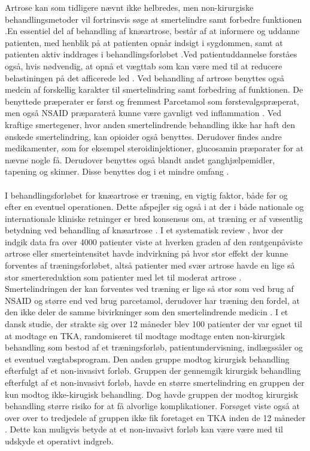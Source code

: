 Artrose kan som tidligere nævnt ikke helbredes, men non-kirurgiske behandlingsmetoder vil fortrinsvis søge at smertelindre samt forbedre funktionen \citep{brostrom2012}.En essentiel del af behandling af knæartrose, består af at informere og uddanne patienten, med henblik på at patienten opnår indsigt i sygdommen, samt at patienten aktiv inddrages i behandlingsforløbet .Ved  patientuddannelse forståes også, hvis nødvendig, at opnå et vægttab som kan være med til at reducere belastiningen på det afficerede led \citep{brostrom2012}.
Ved behandling af artrose benyttes også medcin af forskellig karakter til smertelindring samt forbedring af funktionen. De benyttede præperater er først og fremmest Parcetamol som  førstevalgspræperat, men  også NSAID præparaterå kunne være gavnligt ved inflammation \citep{schroder}. Ved kraftige smertegener, hvor anden smertelindrende behandling ikke har haft den ønskede smertelindring, kan opioider også benyttes. Derudover findes andre medikamenter, som for eksempel steroidinjektioner, glucosamin præparater for at nævne nogle få. Derudover benyttes også blandt andet ganghjælpemidler, tapening og skinner. Disse benyttes dog i et mindre omfang \citep{brostrom2012}.\\\\

I behandlingsforløbet for knæartrose er træning, en vigtig faktor, både før og efter en eventuel operationen. Dette afspejler sig også i at der i både nationale og internationale kliniske retninger er bred konsensus om, at træning er af væsentlig betydning ved behandling af  knæartrose  \citep{brostrom2012}.  I et systematisk review , hvor der indgik data fra over 4000 patienter viste at hverken graden af den røntgenpåviste artrose eller smerteintensitet havde indvirkning på hvor stor effekt der kunne forventes af træningsforløbet, altså patienter med svær artrose havde en lige så stor smertereduktion som patienter med let til moderat artrose \citep{Syssorenskou}. 
Smertelindringen der kan forventes ved træning er lige så stor som ved brug af NSAID og større end  ved brug parcetamol, derudover har træning den fordel, at den ikke deler de samme bivirkninger som den smertelindrende medicin \citep{sorenskou}.
I et dansk studie, der strakte sig over 12 måneder blev 100 patienter  der var egnet til at modtage en TKA, randomiseret til modtage modtage enten non-kirurgisk behandling som bestod af et træningsforløb, patientundervisning, indlægssåler og et eventuel vægtabsprogram. Den anden gruppe modtog kirurgisk behandling efterfulgt af et non-invasivt forløb. Gruppen der gennemgik kirurgisk behandling efterfulgt af  et non-invasivt forløb, havde en større smertelindring en gruppen der kun modtog ikke-kirugisk behandling. Dog havde gruppen der modtog kirurgisk behandling større risiko for at få alvorlige komplikationer. Forsøget viste også at over over to tredjedele af gruppen ikke fik foretaget en TKA inden de 12 måneder \citep{newEngland}. Dette kan muligvis betyde at et non-invasivt forløb kan være være med til udskyde et operativt indgreb.

